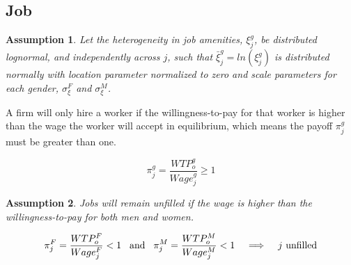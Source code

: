 \documentclass[11pt]{article}
\newtheorem{assumption}{Assumption}
\begin{document}
\subsection{Job}
\begin{assumption}
Let the heterogeneity in job amenities, $\xi^g_j$, be distributed lognormal, and independently across $j$, such that $\bar{\xi}^g_j = ln(\xi^g_j)$ is distributed normally with location parameter normalized to zero and scale parameters for each gender, $\sigma^F_{\xi}$ and $\sigma^M_{\xi}$.
\end{assumption}
%
%

A firm will only hire a worker if the willingness-to-pay for that worker is higher than the wage the worker will accept in equilibrium, which means the payoff $ \pi^g_j $ must be greater than one.

$$ \pi^g_j = \frac{WTP^g_o}{Wage^g_j} \geq 1 $$

\begin{assumption}
Jobs will remain unfilled if the wage is higher than the willingness-to-pay for both men and women.
\end{assumption}

$$ \pi^F_j = \frac{WTP^F_o}{Wage^F_j} < 1 \hspace{3mm} \text{and}  \hspace{3mm} \pi^M_j = \frac{WTP^M_o}{Wage^M_j} < 1 \hspace{3mm} \implies \hspace{3mm} \text{$j$ unfilled}$$

\end{document}
